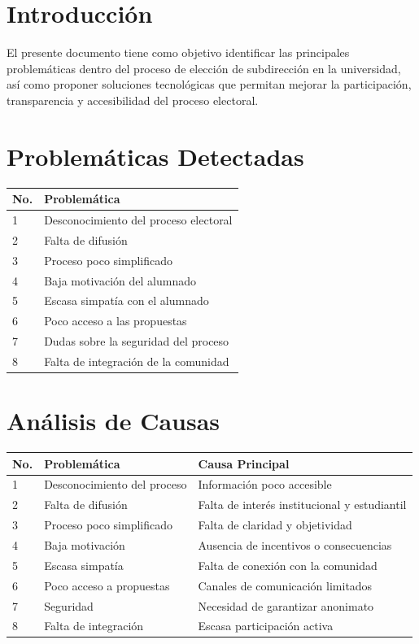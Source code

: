\documentclass[12pt,letterpaper]{article}
\begin{document}
\section{Introducción}
El presente documento tiene como objetivo identificar las principales problemáticas dentro del proceso de elección de subdirección en la universidad, así como proponer soluciones tecnológicas que permitan mejorar la participación, transparencia y accesibilidad del proceso electoral.

\section{Problemáticas Detectadas}

\begin{table}[h!]
\centering
\begin{tabular}{p{0.8cm} p{11cm}}
\toprule
\textbf{No.} & \textbf{Problemática} \\
\midrule
1 & Desconocimiento del proceso electoral \\
2 & Falta de difusión \\
3 & Proceso poco simplificado \\
4 & Baja motivación del alumnado \\
5 & Escasa simpatía con el alumnado \\
6 & Poco acceso a las propuestas \\
7 & Dudas sobre la seguridad del proceso \\
8 & Falta de integración de la comunidad \\
\bottomrule
\end{tabular}
\end{table}

\section{Análisis de Causas}

\begin{table}[h!]
\centering
\begin{tabular}{p{0.8cm} p{5.5cm} p{5.5cm}}
\toprule
\textbf{No.} & \textbf{Problemática} & \textbf{Causa Principal} \\
\midrule
1 & Desconocimiento del proceso & Información poco accesible \\
2 & Falta de difusión & Falta de interés institucional y estudiantil \\
3 & Proceso poco simplificado & Falta de claridad y objetividad \\
4 & Baja motivación & Ausencia de incentivos o consecuencias \\
5 & Escasa simpatía & Falta de conexión con la comunidad \\
6 & Poco acceso a propuestas & Canales de comunicación limitados \\
7 & Seguridad & Necesidad de garantizar anonimato \\
8 & Falta de integración & Escasa participación activa \\
\bottomrule
\end{tabular}
\end{table}
\end{document}
